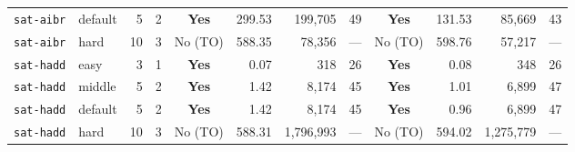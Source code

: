\begin{table}[htbp]
{\begin{tabular}{ll rr crrr crrr}
\texttt{sat-aibr} & default & 5 & 2 & \textbf{Yes} & 299.53 & 199,705 & 49 & \textbf{Yes} & 131.53 & 85,669 & 43 \\
\texttt{sat-aibr} & hard & 10 & 3 & No (TO) & 588.35 & 78,356 & --- & No (TO) & 598.76 & 57,217 & --- \\
\midrule
\texttt{sat-hadd} & easy & 3 & 1 & \textbf{Yes} & 0.07 & 318 & 26 & \textbf{Yes} & 0.08 & 348 & 26 \\
\texttt{sat-hadd} & middle & 5 & 2 & \textbf{Yes} & 1.42 & 8,174 & 45 & \textbf{Yes} & 1.01 & 6,899 & 47 \\
\texttt{sat-hadd} & default & 5 & 2 & \textbf{Yes} & 1.42 & 8,174 & 45 & \textbf{Yes} & 0.96 & 6,899 & 47 \\
\texttt{sat-hadd} & hard & 10 & 3 & No (TO) & 588.31 & 1,796,993 & --- & No (TO) & 594.02 & 1,275,779 & --- \\
\bottomrule
\end{tabular}%
}
\end{table}
